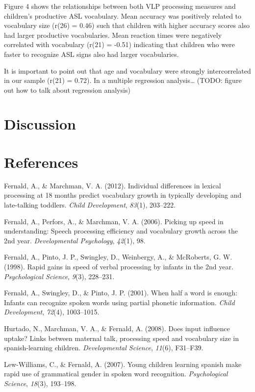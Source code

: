 \documentclass[12pt,]{article}
\begin{document}
Figure 4 shows the relationships between both VLP processing measures
and children's productive ASL vocabulary. Mean accuracy was positively
related to vocabulary size (r(26) = 0.46) such that children with higher
accuracy scores also had larger productive vocabularies. Mean reaction
times were negatively correlated with vocabulary (r(21) = -0.51)
indicating that children who were faster to recognize ASL signs also had
larger vocabularies.

It is important to point out that age and vocabulary were strongly
intercorrelated in our sample (r(21) = 0.72). In a multiple regression
analysis\ldots{} (TODO: figure out how to talk about regression
analysis)

\section{Discussion}\label{discussion}

\newpage 

\section*{References}\label{references}

Fernald, A., \& Marchman, V. A. (2012). Individual differences in
lexical processing at 18 months predict vocabulary growth in typically
developing and late-talking toddlers. \emph{Child Development},
\emph{83}(1), 203--222.

Fernald, A., Perfors, A., \& Marchman, V. A. (2006). Picking up speed in
understanding: Speech processing efficiency and vocabulary growth across
the 2nd year. \emph{Developmental Psychology}, \emph{42}(1), 98.

Fernald, A., Pinto, J. P., Swingley, D., Weinbergy, A., \& McRoberts, G.
W. (1998). Rapid gains in speed of verbal processing by infants in the
2nd year. \emph{Psychological Science}, \emph{9}(3), 228--231.

Fernald, A., Swingley, D., \& Pinto, J. P. (2001). When half a word is
enough: Infants can recognize spoken words using partial phonetic
information. \emph{Child Development}, \emph{72}(4), 1003--1015.

Hurtado, N., Marchman, V. A., \& Fernald, A. (2008). Does input
influence uptake? Links between maternal talk, processing speed and
vocabulary size in spanish-learning children. \emph{Developmental
Science}, \emph{11}(6), F31--F39.

Lew-Williams, C., \& Fernald, A. (2007). Young children learning spanish
make rapid use of grammatical gender in spoken word recognition.
\emph{Psychological Science}, \emph{18}(3), 193--198.
\end{document}
